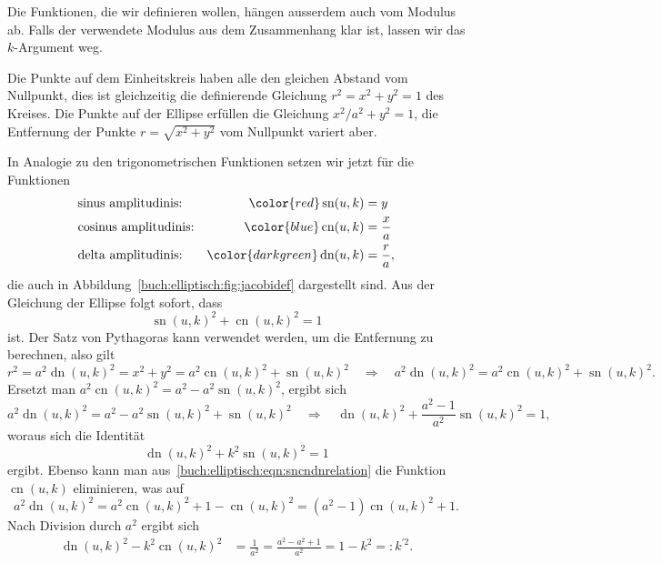 Die Funktionen, die wir definieren wollen, hängen ausserdem auch 
vom Modulus ab.
Falls der verwendete Modulus aus dem Zusammenhang klar ist, lassen
wir das $k$-Argument weg.

Die Punkte auf dem Einheitskreis haben alle den gleichen Abstand vom
Nullpunkt, dies ist gleichzeitig die definierende Gleichung $r^2=x^2+y^2=1$
des Kreises.
Die Punkte auf der Ellipse erfüllen die Gleichung $x^2/a^2+y^2=1$,
die Entfernung der Punkte $r=\sqrt{x^2+y^2}$ vom Nullpunkt variert aber.

In Analogie zu den trigonometrischen Funktionen setzen wir jetzt für 
die Funktionen
\[
\begin{aligned}
&\text{sinus amplitudinis:}&
{\color{red}\operatorname{sn}(u,k)}&= y \\
&\text{cosinus amplitudinis:}&
{\color{blue}\operatorname{cn}(u,k)}&= \frac{x}{a} \\
&\text{delta amplitudinis:}&
{\color{darkgreen}\operatorname{dn}(u,k)}&=\frac{r}{a},
\end{aligned}
\]
die auch in Abbildung~\ref{buch:elliptisch:fig:jacobidef}
dargestellt sind.
Aus der Gleichung der Ellipse folgt sofort, dass
\[
\operatorname{sn}(u,k)^2 + \operatorname{cn}(u,k)^2 = 1
\]
ist.
Der Satz von Pythagoras kann verwendet werden, um die Entfernung zu
berechnen, also gilt
\begin{equation}
r^2
=
a^2 \operatorname{dn}(u,k)^2
=
x^2 + y^2
=
a^2\operatorname{cn}(u,k)^2 + \operatorname{sn}(u,k)^2
\quad
\Rightarrow
\quad
a^2 \operatorname{dn}(u,k)^2
=
a^2\operatorname{cn}(u,k)^2 + \operatorname{sn}(u,k)^2.
\label{buch:elliptisch:eqn:sncndnrelation}
\end{equation}
Ersetzt man
$
a^2\operatorname{cn}(u,k)^2
=
a^2-a^2\operatorname{sn}(u,k)^2
$, ergibt sich
\[
a^2 \operatorname{dn}(u,k)^2
=
a^2-a^2\operatorname{sn}(u,k)^2
+
\operatorname{sn}(u,k)^2
\quad
\Rightarrow
\quad
\operatorname{dn}(u,k)^2
+
\frac{a^2-1}{a^2}\operatorname{sn}(u,k)^2
=
1,
\]
woraus sich die Identität
\[
\operatorname{dn}(u,k)^2 + k^2 \operatorname{sn}(u,k)^2 = 1
\]
ergibt.
Ebenso kann man aus~\eqref{buch:elliptisch:eqn:sncndnrelation}
die Funktion $\operatorname{cn}(u,k)$ eliminieren, was auf
\[
a^2\operatorname{dn}(u,k)^2
=
a^2\operatorname{cn}(u,k)^2
+1-\operatorname{cn}(u,k)^2
=
(a^2-1)\operatorname{cn}(u,k)^2
+1.
\]
Nach Division durch $a^2$ ergibt sich
\begin{align*}
\operatorname{dn}(u,k)^2
-
k^2\operatorname{cn}(u,k)^2
&=
\frac{1}{a^2}
=
\frac{a^2-a^2+1}{a^2}
=
1-k^2 =: k^{\prime 2}.
\end{align*}
